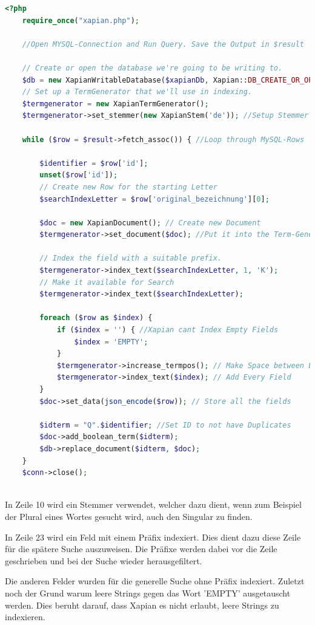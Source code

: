\begin{lstlisting}[language=php, frame=single, label={lst:XapPhp}, 
	morekeywords={type,uninvertible,indexed,stored,field,multiValued, name}] 
	<?php
	require_once("xapian.php");
	
	//Open MYSQL-Connection and Run Query. Save the Output in $result
	
	// Create or open the database we're going to be writing to.
	$db = new XapianWritableDatabase($xapianDb, Xapian::DB_CREATE_OR_OPEN);
	// Set up a TermGenerator that we'll use in indexing.
	$termgenerator = new XapianTermGenerator();
	$termgenerator->set_stemmer(new XapianStem('de')); //Setup Stemmer
	
	while ($row = $result->fetch_assoc()) { //Loop through MySQL-Rows
	
		$identifier = $row['id'];
		unset($row['id']);
		// Create new Row for the starting Letter
		$searchIndexLetter = $row['original_bezeichnung'][0];

		$doc = new XapianDocument(); // Create new Document
		$termgenerator->set_document($doc); //Put it into the Term-Generator
	
		// Index the field with a suitable prefix.
		$termgenerator->index_text($searchIndexLetter, 1, 'K'); 
		// Make it available for Search
		$termgenerator->index_text($searchIndexLetter); 
	
		foreach ($row as $index) {
			if ($index = '') { //Xapian cant Index Empty Fields
				$index = 'EMPTY';
			}
			$termgenerator->increase_termpos(); // Make Space between Entries
			$termgenerator->index_text($index); // Add Every Field
		}
		$doc->set_data(json_encode($row)); // Store all the fields
	
		$idterm = "Q".$identifier; //Set ID to not have Duplicates
		$doc->add_boolean_term($idterm);
		$db->replace_document($idterm, $doc);
	}
	$conn->close();
	
  \end{lstlisting}

In Zeile 10 wird ein Stemmer verwendet, welcher dazu dient, wenn zum Beispiel der Plural eines Wortes gesucht wird, auch den Singular zu finden.

In Zeile 23 wird ein Feld mit einem Präfix indexiert. Dies dient dazu diese Zeile für die spätere Suche auszuweisen. Die Präfixe werden dabei vor die Zeile geschrieben und bei der Suche wieder herausgefiltert. 

Die anderen Felder wurden für die generelle Suche ohne Präfix indexiert. Zuletzt noch der Grund warum leere Strings gegen das Wort 'EMPTY' ausgetauscht werden. Dies beruht darauf, dass Xapian es nicht erlaubt, leere Strings zu indexieren.

